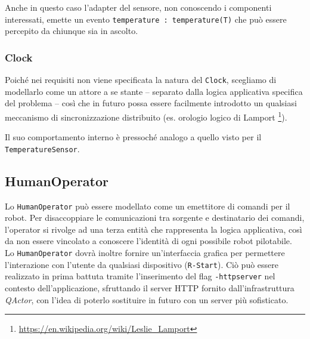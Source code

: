 \documentclass{../llncs}
\newcommand{\codescript}[1]{{\mbox{\small{\texttt{#1}}}}\xspace}
\newcommand{\code}[1]{{\color{blue}\small{\texttt{#1}}}}
\newcommand{\qa}{\textsf{\textit{QActor}}}
\begin{document}
Anche in questo caso l'adapter del sensore, non conoscendo i componenti interessati, emette un evento \codescript{temperature : temperature(T)} che può essere percepito da chiunque sia in ascolto.\\



\subsubsection{Clock}
Poiché nei requisiti non viene specificata la natura del \texttt{Clock}, scegliamo di modellarlo come un attore a se stante -- separato dalla logica applicativa specifica del problema -- così che in futuro possa essere facilmente introdotto un qualsiasi meccanismo di sincronizzazione distribuito (es. orologio logico di Lamport
\footnote{\url{https://en.wikipedia.org/wiki/Leslie_Lamport}}).



Il suo comportamento interno è pressoché analogo a quello visto per il \texttt{TemperatureSensor}.

\subsection{HumanOperator}
Lo \texttt{HumanOperator} può essere modellato come un emettitore di comandi per il robot. Per disaccoppiare le comunicazioni tra sorgente e destinatario dei comandi, l'operator si rivolge ad una terza entità che rappresenta la logica applicativa, così da non essere vincolato a conoscere l'identità di ogni possibile robot pilotabile.\\



Lo \texttt{HumanOperator} dovrà inoltre fornire un'interfaccia grafica per permettere l'interazione con l'utente da qualsiasi dispositivo (\code{R-Start}). Ciò può essere realizzato in prima battuta tramite l'inserimento del flag \codescript{-httpserver} nel contesto dell'applicazione, sfruttando il server HTTP fornito dall'infrastruttura \qa, con l'idea di poterlo sostituire in futuro con un server più sofisticato.\\
\end{document}
